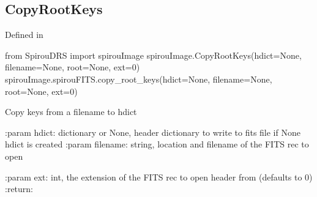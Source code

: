 \noindent\begin{minipage}{\textwidth}
\subsection{CopyRootKeys}

Defined in \spirouImage{}

\begin{pythonbox}
from SpirouDRS import spirouImage
spirouImage.CopyRootKeys(hdict=None, filename=None, root=None, ext=0)
spirouImage.spirouFITS.copy_root_keys(hdict=None, filename=None, root=None, ext=0)
\end{pythonbox}

\begin{pythondocstring}
Copy keys from a filename to hdict

:param hdict: dictionary or None, header dictionary to write to fits file
              if None hdict is created
:param filename: string, location and filename of the FITS rec to open

:param ext: int, the extension of the FITS rec to open header from
            (defaults to 0)
:return:
\end{pythondocstring}
\end{minipage}


